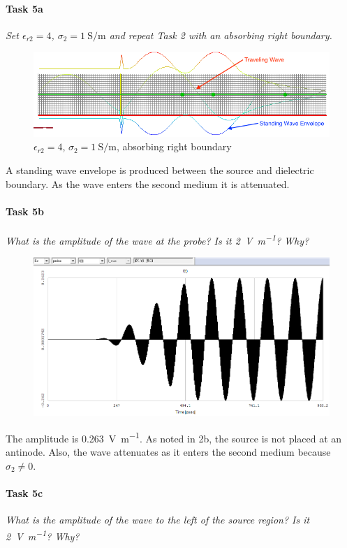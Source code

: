 \paragraph{Task 5a} \textit{Set $\epsilon_{r2} = 4$, $\sigma_2 = \SI{1}{\siemens\per\meter}$ and repeat Task 2 with an absorbing right boundary.}
\begin{figure}[tbph]
	\centering
	\includegraphics[width=0.95\linewidth]{graphics/Task2-5a-Standing}
	\caption{$\epsilon_{r2} = 4$, $\sigma_2 = \SI{1}{\siemens\per\meter}$, absorbing right boundary}
	\label{fig:Task2-5a-Standing}
\end{figure}

A standing wave envelope is produced between the source and dielectric boundary.
As the wave enters the second medium it is attenuated.

\paragraph{Task 5b} \textit{What is the amplitude of the wave at the probe? Is it \SI{2}{\volt\per\meter}? Why?}
\begin{figure}[tbph]
	\centering
	\includegraphics[width=0.6\linewidth]{graphics/Task2-5b-Amplitude}
\end{figure}

The amplitude is \SI{0.263}{\volt\per\meter}.
As noted in 2b, the source is not placed at an antinode.
Also, the wave attenuates as it enters the second medium because $\sigma_2 \ne 0$.

\pagebreak
\paragraph{Task 5c} \textit{What is the amplitude of the wave to the left of the source region? Is it \SI{2}{\volt\per\meter}? Why?}

